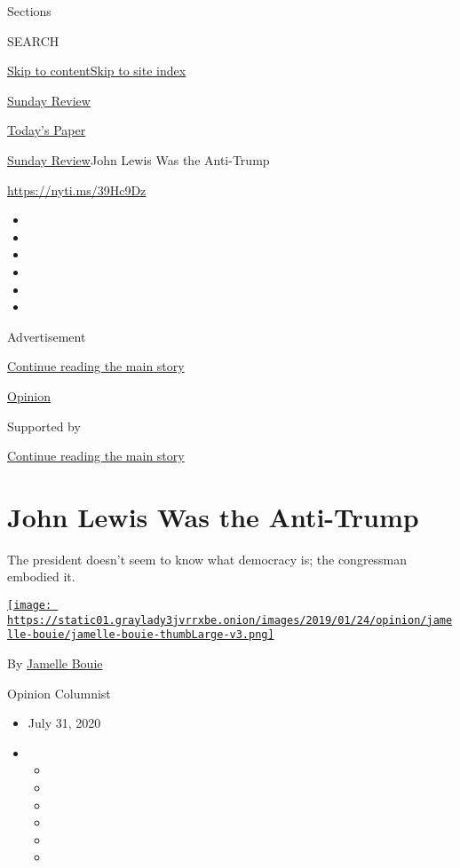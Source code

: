 Sections

SEARCH

\protect\hyperlink{site-content}{Skip to
content}\protect\hyperlink{site-index}{Skip to site index}

\href{https://www.nytimes3xbfgragh.onion/section/opinion/sunday}{Sunday
Review}

\href{https://myaccount.nytimes3xbfgragh.onion/auth/login?response_type=cookie\&client_id=vi}{}

\href{https://www.nytimes3xbfgragh.onion/section/todayspaper}{Today's
Paper}

\href{/section/opinion/sunday}{Sunday Review}\textbar{}John Lewis Was
the Anti-Trump

\href{https://nyti.ms/39Hc9Dz}{https://nyti.ms/39Hc9Dz}

\begin{itemize}
\item
\item
\item
\item
\item
\item
\end{itemize}

Advertisement

\protect\hyperlink{after-top}{Continue reading the main story}

\href{/section/opinion}{Opinion}

Supported by

\protect\hyperlink{after-sponsor}{Continue reading the main story}

\hypertarget{john-lewis-was-the-anti-trump}{%
\section{John Lewis Was the
Anti-Trump}\label{john-lewis-was-the-anti-trump}}

The president doesn't seem to know what democracy is; the congressman
embodied it.

\href{https://www.nytimes3xbfgragh.onion/column/jamelle-bouie}{\texttt{[image: https://static01.graylady3jvrrxbe.onion/images/2019/01/24/opinion/jamelle-bouie/jamelle-bouie-thumbLarge-v3.png]}}

By
\href{https://www.nytimes3xbfgragh.onion/column/jamelle-bouie}{Jamelle
Bouie}

Opinion Columnist

\begin{itemize}
\item
  July 31, 2020
\item
  \begin{itemize}
  \item
  \item
  \item
  \item
  \item
  \item
  \end{itemize}
\end{itemize}

